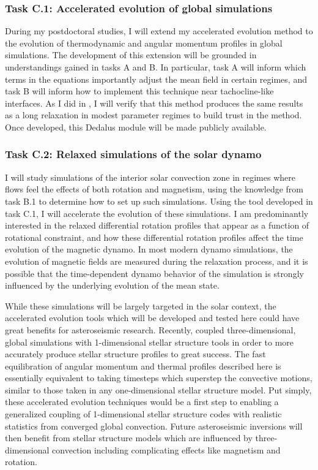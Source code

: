 \documentclass[aasms,11pt, longbibliography]{article}
\begin{document}
\subsubsection{Task C.1: Accelerated evolution of global simulations}
\label{sct:taskC1}
During my postdoctoral studies, I will extend my accelerated evolution method to the evolution of thermodynamic and angular momentum profiles in global simulations.
The development of this extension will be grounded in understandings gained in tasks A and B.
In particular, task A will inform which terms in the equations importantly adjust the mean field in certain regimes, and task B will inform how to implement this technique near tachocline-like interfaces.
As I did in \citet{anders&all2018}, I will verify that this method produces the same results as a long relaxation in modest parameter regimes to build trust in the method.
Once developed, this Dedalus module will be made publicly available.

\subsubsection{Task C.2: Relaxed simulations of the solar dynamo}
\label{sct:taskC2}
I will study simulations of the interior solar convection zone in regimes where flows feel the effects of both rotation and magnetism, using the knowledge from task B.1 to determine how to set up such simulations.
Using the tool developed in task C.1, I will accelerate the evolution of these simulations.
I am predominantly interested in the relaxed differential rotation profiles that appear as a function of rotational constraint, and how these differential rotation profiles affect the time evolution of the magnetic dynamo.
In most modern dynamo simulations, the evolution of magnetic fields are measured during the relaxation process, and it is possible that the time-dependent dynamo behavior of the simulation is strongly influenced by the underlying evolution of the mean state.

While these simulations will be largely targeted in the solar context, the accelerated evolution tools which will be developed and tested here could have great benefits for asteroseismic research.
Recently, \citet{jorgensen&weiss2019} coupled three-dimensional, global simulations with 1-dimensional stellar structure tools in order to more accurately produce stellar structure profiles to great success.
The fast equilibration of angular momentum and thermal profiles described here is essentially equivalent to taking timesteps which superstep the convective motions, similar to those taken in any one-dimensional stellar structure model.
Put simply, these accelerated evolution techniques would be a first step to enabling a generalized coupling of 1-dimensional stellar structure codes with realistic statistics from converged global convection.
Future asteroseismic inversions will then benefit from stellar structure models which are influenced by three-dimensional convection including complicating effects like magnetism and rotation.
\end{document}
